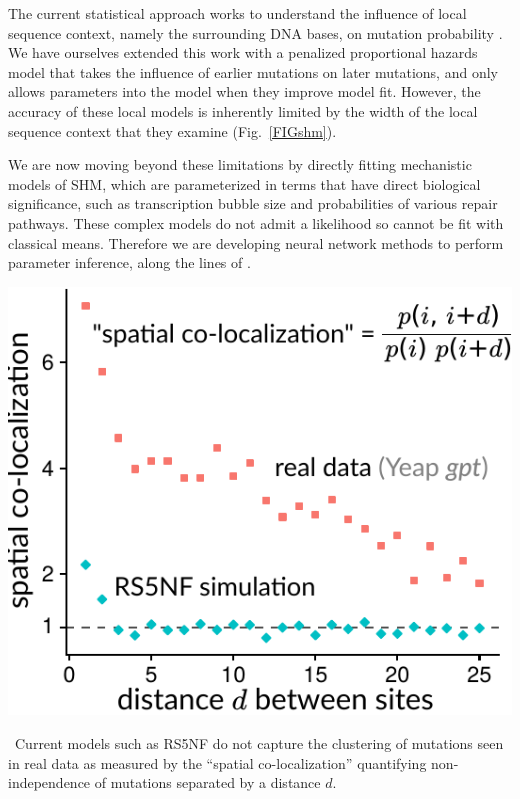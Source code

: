 \documentclass[nobib]{tufte-handout}
\begin{document}
The current statistical approach works to understand the influence of local sequence context, namely the surrounding DNA bases, on mutation probability \cite{Rogozin1992-xv,Yaari2013-dg,Cui2016-wz}.
We have ourselves extended this work with a penalized  proportional hazards model \cite{Feng2019-sj} that takes the influence of earlier mutations on later mutations, and only allows parameters into the model when they improve model fit.
However, the accuracy of these local models is inherently limited by the width of the local sequence context that they examine (Fig.~\ref{FIGshm}).

We are now moving beyond these limitations by directly fitting mechanistic models of SHM, which are parameterized in terms that have direct biological significance, such as transcription bubble size and probabilities of various repair pathways.
These complex models do not admit a likelihood so cannot be fit with classical means.
Therefore we are developing neural network methods to perform parameter inference, along the lines of \cite{Jiang2017-xs,Chan2018-qq}.


\begin{marginfigure}[0.in]%
\begin{centering}
    \includegraphics[width=\textwidth]{spatial-co-localization}
\end{centering}
  \caption{\
   Current models such as RS5NF \cite{Cui2016-wz} do not capture the clustering of mutations seen in real data \cite{Yeap2015-nl} as measured by the ``spatial co-localization'' \cite{Marcou2018-sm} quantifying non-independence of mutations separated by a distance $d$.
    }
  \label{FIGshm}
\end{marginfigure}%
\end{document}
